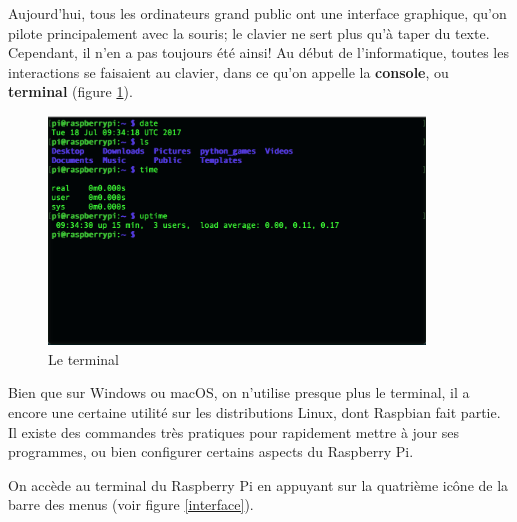 Aujourd'hui, tous les ordinateurs grand public ont une interface graphique, qu'on pilote principalement avec la souris; le clavier ne sert plus qu'à taper du texte. Cependant, il n'en a pas toujours été ainsi! Au début de l'informatique, toutes les interactions se faisaient au clavier, dans ce qu'on appelle la \textbf{console}, ou \textbf{terminal} (figure \ref{terminal}).

\begin{figure}[h!]
\begin{center}
\includegraphics[width=10cm]{ssh.png}
\end{center}
\caption{Le terminal}
\label{terminal}
\end{figure}

Bien que sur Windows ou macOS, on n'utilise presque plus le terminal, il a encore une certaine utilité sur les distributions Linux, dont Raspbian fait partie.
Il existe des commandes très pratiques pour rapidement mettre à jour ses programmes, ou bien configurer certains aspects du Raspberry Pi.

On accède au terminal du Raspberry Pi en appuyant sur la quatrième icône de la barre des menus (voir figure \ref{interface}).